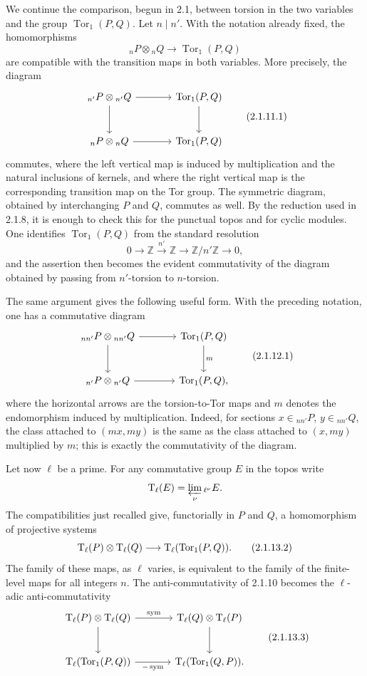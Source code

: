 \documentclass[11pt]{article}
\providecommand{\Tor}{\operatorname{Tor}}
\providecommand{\Z}{\mathbb Z}
\begin{document}
We continue the comparison, begun in 2.1, between torsion in the two variables and the group
\(\Tor_1(P,Q)\).  Let \(n\mid n'\).  With the notation already fixed, the homomorphisms
\[
        {}_nP\otimes {}_nQ\longrightarrow \Tor_1(P,Q)
\]
are compatible with the transition maps in both variables.  More precisely, the diagram
\[
\begin{tikzcd}[column sep=large,row sep=large]
 {}_{n'}P\otimes {}_{n'}Q \arrow[r]\arrow[d] & \Tor_1(P,Q)\arrow[d]\\
 {}_{n}P\otimes {}_{n}Q \arrow[r] & \Tor_1(P,Q)
\end{tikzcd}
\qquad\text{(2.1.11.1)}
\]
commutes, where the left vertical map is induced by multiplication and the natural inclusions of kernels, and where the right vertical map is the corresponding transition map on the Tor group.  The symmetric diagram, obtained by interchanging \(P\) and \(Q\), commutes as well.  By the reduction used in 2.1.8, it is enough to check this for the punctual topos and for cyclic modules.  One identifies \(\Tor_1(P,Q)\) from the standard resolution
\[
        0\longrightarrow \Z\xrightarrow{n'}\Z\longrightarrow \Z/n'\Z\longrightarrow 0,
\]
and the assertion then becomes the evident commutativity of the diagram obtained by passing from \(n'\)-torsion to \(n\)-torsion.

The same argument gives the following useful form.  With the preceding notation, one has a commutative diagram
\[
\begin{tikzcd}[column sep=large,row sep=large]
 {}_{nn'}P\otimes {}_{nn'}Q \arrow[r]\arrow[d] & \Tor_1(P,Q)\arrow[d,"m"]\\
 {}_{n'}P\otimes {}_{n'}Q \arrow[r] & \Tor_1(P,Q),
\end{tikzcd}
\qquad\text{(2.1.12.1)}
\]
where the horizontal arrows are the torsion-to-Tor maps and \(m\) denotes the endomorphism induced by multiplication.  Indeed, for sections \(x\in {}_{nn'}P\), \(y\in {}_{nn'}Q\), the class attached to \((mx,my)\) is the same as the class attached to \((x,my)\) multiplied by \(m\); this is exactly the commutativity of the diagram.

Let now \(\ell\) be a prime.  For any commutative group \(E\) in the topos write
\[
        \mathrm T_\ell(E)=\varprojlim_\nu {}_{\ell^\nu}E.
\]
The compatibilities just recalled give, functorially in \(P\) and \(Q\), a homomorphism of projective systems
\[
        \Tate_\ell(P)\otimes \Tate_\ell(Q)
        \longrightarrow \Tate_\ell(\Tor_1(P,Q)).
\qquad\text{(2.1.13.2)}
\]
The family of these maps, as \(\ell\) varies, is equivalent to the family of the finite-level maps for all integers \(n\).  The anti-commutativity of 2.1.10 becomes the \(\ell\)-adic anti-commutativity
\[
\begin{tikzcd}[column sep=large,row sep=large]
 \Tate_\ell(P)\otimes \Tate_\ell(Q) \arrow[r,"\mathrm{sym}"]\arrow[d] &
 \Tate_\ell(Q)\otimes \Tate_\ell(P)\arrow[d]\\
 \Tate_\ell(\Tor_1(P,Q))\arrow[r,"-\,\mathrm{sym}"'] &
 \Tate_\ell(\Tor_1(Q,P)).
\end{tikzcd}
\qquad\text{(2.1.13.3)}
\]
\end{document}
